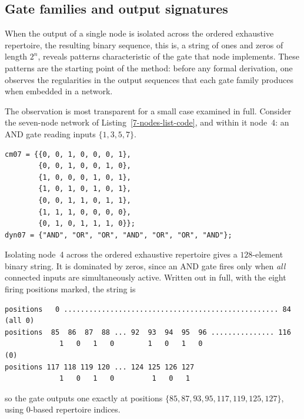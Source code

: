 \documentclass[11pt]{article}
\begin{document}
\subsection{Gate families and output signatures}\label{sec:gate-families}

When the output of a single node is isolated across the ordered
exhaustive repertoire, the resulting binary sequence, this is, a string of ones
and zeros of length $2^n$, reveals patterns characteristic of the gate
that node implements.  These patterns are the starting point of the
method: before any formal derivation, one observes the regularities in
the output sequences that each gate family produces when embedded in a
network.

The observation is most transparent for a small case examined in full.
Consider the seven-node network of Listing~\ref{7-nodes-list-code}, and
within it node~4: an AND gate reading inputs $\{1,3,5,7\}$.

\begin{lstlisting}[style=MathematicaStyle,caption={Seven-node network used
throughout this section.  Node 4 is an AND gate over inputs $\{1,3,5,7\}$;
nodes $\{2,4,6\}$ do not feed it.},label={7-nodes-list-code}]
cm07 = {{0, 0, 1, 0, 0, 0, 1},
        {0, 0, 1, 0, 0, 1, 0},
        {1, 0, 0, 0, 1, 0, 1},
        {1, 0, 1, 0, 1, 0, 1},
        {0, 0, 1, 1, 0, 1, 1},
        {1, 1, 1, 0, 0, 0, 0},
        {0, 1, 0, 1, 1, 1, 0}};
dyn07 = {"AND", "OR", "OR", "AND", "OR", "OR", "AND"};
\end{lstlisting}

Isolating node~4 across the ordered exhaustive repertoire gives a
$128$-element binary string.  It is dominated by zeros, since an AND gate
fires only when \emph{all} connected inputs are simultaneously active.
Written out in full, with the eight firing positions marked, the string is

\begin{lstlisting}[style=MathematicaOutput]
positions   0 ................................................... 84   (all 0)
positions  85  86  87  88 ... 92  93  94  95  96 ............... 116
             1   0   1   0        1   0   1   0                        (0)
positions 117 118 119 120 ... 124 125 126 127
             1   0   1   0         1   0   1
\end{lstlisting}

\noindent
so the gate outputs one exactly at positions
$\{85,87,93,95,117,119,125,127\}$, using $0$-based repertoire indices.
\end{document}
